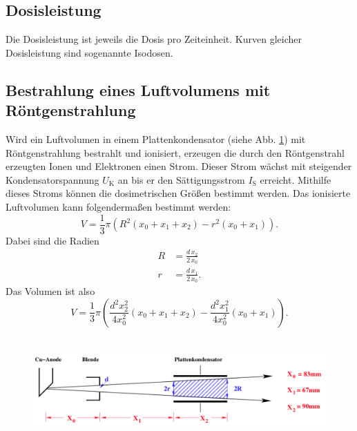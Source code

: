 \subsection{Dosisleistung}
Die Dosisleistung ist jeweils die Dosis pro Zeiteinheit.
Kurven gleicher Dosisleistung sind sogenannte Isodosen.

\subsection{Bestrahlung eines Luftvolumens mit Röntgenstrahlung}
Wird ein Luftvolumen in einem Plattenkondensator
(siehe Abb. \ref{fig:Strahlgeometrie}) mit
Röntgenstrahlung bestrahlt und ionisiert, erzeugen die durch
den Röntgenstrahl erzeugten Ionen und Elektronen einen Strom.
Dieser Strom wächst mit steigender Kondensatorspannung 
$U_\text{K}$ an bis er den Sättigungsstrom $I_\text{S}$
erreicht. Mithilfe dieses Stroms können die dosimetrischen
Größen bestimmt werden.
\newline
Das ionisierte Luftvolumen kann folgendermaßen bestimmt werden:
\begin{equation*}
    V = \frac{1}{3} \pi (R^2 (x_0 + x_1 + x_2) - r^2 (x_0 + x_1)). 
\end{equation*}
Dabei sind die Radien
\begin{align*}
    R &= \frac{d \, x_2}{2 \, x_0} \\
    r &= \frac{d \, x_1}{2 \, x_0}. 
\end{align*}
Das Volumen ist also 
\begin{equation}
    V = \frac{1}{3} \pi \left(\frac{d^2 x_2^2}{4 x_0^2}(x_0 + x_1 + x_2) - \frac{d^2 x_1^2}{4 x_0^2}(x_0 + x_1)\right).
    \label{eqn:V}
\end{equation}

\begin{figure}
    \centering
    \includegraphics[width=12cm, height=4cm]{build/strahl.png}
    \caption{\cite{V607}}
    \label{fig:Strahlgeometrie}
\end{figure}

 